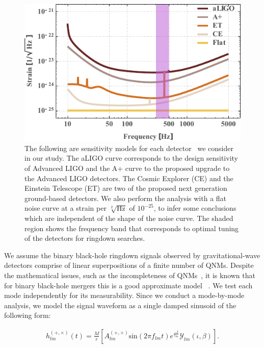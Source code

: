 \begin{figure}
\includegraphics[width=\columnwidth]{figures/DetCurves_Edit1.pdf}
\caption{\label{fig:DetectorCurve}The following are sensitivity models for each detector~\cite{Evans:2016dc} we consider in our study. The aLIGO curve corresponds to the design sensitivity of Advanced LIGO and the A+ curve to the proposed upgrade to the Advanced LIGO detectors. The Cosmic Explorer (CE) and the Einstein Telescope (ET) are two of the proposed next generation ground-based detectors. We also perform the analysis with a flat noise curve at a strain per $\sqrt[2]{\mathrm{Hz}}$ of $10^{-25}$, to infer some conclusions which are independent of the shape of the noise curve. The shaded region shows the frequency band that corresponds to optimal tuning of the detectors for ringdown searches. }
\end{figure}

We assume the binary black-hole ringdown signals observed by gravitational-wave detectors comprise of linear superpositions of a finite number of QNMs. Despite the mathematical issues, such as the incompleteness of QNMs~\cite{1999CMaPh.204..397B,lrr-1999-2}, it is known that for binary black-hole mergers this is a good approximate model ~\cite{2008GReGr..40.1705R, 2006PhRvD..74j4020B}. We test each mode independently for its measurability. Since we conduct a mode-by-mode analysis, we model the signal waveform as a single damped sinusoid of the following form:

\begin{align}
h_{lm}^{(+, \times)} (t) = \frac{M}{r}\left[A_{lm}^{(+,\times)} \mathrm{sin}(2 \pi f_{lm} t) e^{\frac{-t}{\tau_{lm}}} \mathcal{Y}_{lm}(\iota, \beta) \right].
\end{align}

